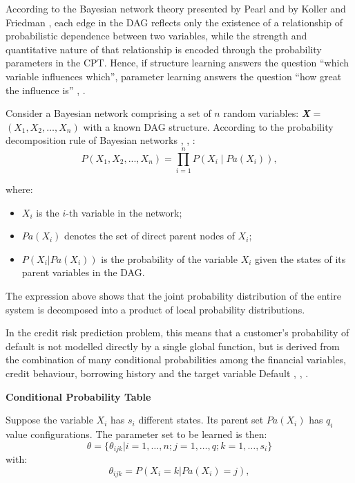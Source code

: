 According to the Bayesian network theory presented by Pearl \cite{pearl2009causality} and by Koller and Friedman \cite{koller2009probabilistic}, each edge in the DAG reflects only the existence of a relationship of probabilistic dependence between two variables, while the strength and quantitative nature of that relationship is encoded through the probability parameters in the CPT. Hence, if structure learning answers the question ``which variable influences which'', parameter learning answers the question ``how great the influence is'' \cite{pearl2009causality}, \cite{koller2009probabilistic}. 

Consider a Bayesian network comprising a set of $n$ random variables: \textbf{\textit{X}} = $(X_1,X_2,\ldots,X_n)$ with a known DAG structure.
According to the probability decomposition rule of Bayesian networks \cite{pearl2009causality}, \cite{koller2009probabilistic}, \cite{darwiche2009modeling}:
\begin{equation}
    P(X_1,X_2,...,X_n) = \prod_{i=1}^{n} P(X_i \mid Pa(X_i)),
\end{equation}


\noindent
where:

\begin{itemize}
    \item $X_i$ is the $i$-th variable in the network;
    \item$Pa(X_i)$ denotes the set of direct parent nodes of $X_i$;
    \item$P(X_i|Pa(X_i))$ is the probability of the variable $X_i$ given the states of its parent variables in the DAG.
\end{itemize}

\vspace{1em}
The expression above shows that the joint probability distribution of the entire system is decomposed into a product of local probability distributions.

In the credit risk prediction problem, this means that a customer's probability of default is not modelled directly by a single global function, but is derived from the combination of many conditional probabilities among the financial variables, credit behaviour, borrowing history and the target variable Default \cite{liu2024credit}, \cite{masmoudi2019credit}, \cite{leong2016credit}.

\vspace{1em}
\noindent
\textbf{Conditional Probability Table}

\noindent
Suppose the variable $X_i$ has $s_i$ different states.
Its parent set $Pa(X_i)$ has $q_i$ value configurations.
The parameter set to be learned is then:
$$\theta= \{ \theta_{ijk} | i = 1,\dots, n; j = 1,\dots, q; k = 1, \dots, s_i \}$$
with:
\begin{equation}
    \theta_{ijk} = P(X_i=k|Pa(X_i)=j),
\end{equation}

